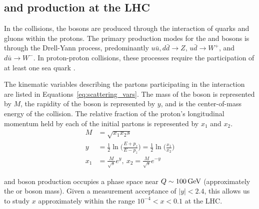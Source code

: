 

\subsection{\W and \Z production at the LHC}
In the \pp collisions, the bosons are produced through the interaction of quarks and gluons within the protons. The primary production modes for the \W and \Z bosons is through the Drell-Yann process, predominantly $u\bar{u}, d\bar{d}\rightarrow Z$,  $u\bar{d}\rightarrow W^+$,  and $d\bar{u}\rightarrow W^-$. In proton-proton collisions, these processes require the participation of at least one sea quark \cite{PhysRevLett.25.316}. 

The kinematic variables describing the partons participating in the interaction are listed in Equations~\ref{eq:scattering_vars}. The mass of the boson is represented by $M$, the rapidity of the boson is represented by $y$, and \s is the center-of-mass energy of the collision. The relative fraction of the proton's longitudinal momentum held by each of the initial partons is represented by $x_1$ and $x_2$. 
\begin{equation}
\begin{aligned}
M &= \sqrt{x_1 x_2 s} \\ 
y &= \frac{1}{2} \ln \bigg( \frac{E+p_z}{E-p_z}\bigg) = \frac{1}{2} \ln \bigg( \frac{x_1}{x_2}\bigg)\\ 
x_1 &= \frac{M}{\sqrt{s}} e^{y},~ x_2 = \frac{M}{\sqrt{s}} e^{-y}
\end{aligned}
\label{eq:scattering_vars}
\end{equation}


\W and \Z boson production occupies a phase space near $Q \sim 100 \,\text{Ge\hspace{-.08em}V}$ (approximately the \W or \Z boson mass). Given a measurement acceptance of $|y| < 2.4$, this allows us to study $x$ approximately within the range $10^{-4} < x < 0.1$ at the LHC.

